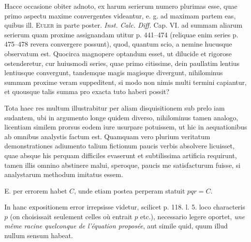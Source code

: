 \expandafter\def\csname HistoricalNoteText3\endcsname{Hacce occasione obiter adnoto, ex harum serierum numero plurimas esse, quae primo aspectu maxime
convergentes videantur, e. g. ad maximam partem eas, quibus ill. \textsc{Euler} in parte poster. \textit{Inst. Calc. Diff.}
Cap. VI. ad summam aliarum serierum quam proxime assignandam utitur p. 441--474 (reliquae enim series
p. 475--478 revera convergere possunt), quod, quantum scio, a nemine hucusque observatum est. Quocirca
magnopere optandum esset, ut dilucide et rigorose ostenderetur, cur huiusmodi series, quae primo citissime,
dein paullatim lentius lentiusque convergunt, tandemque magis magisque divergunt, nihilominus summam
proxime veram suppeditent, si modo non nimis multi termini capiantur, et quousque talis summa pro exacta
tuto haberi possit?}

\expandafter\def\csname HistoricalNoteText4\endcsname{Tota haec res multum illustrabitur per aliam disquisitionem sub prelo iam sudantem, ubi in argumento
longe quidem diverso, nihilominus tamen analogo, licentiam similem prorsus eodem iure usurpare
potuissem, ut hic in aequationibus ab omnibus analystis factum est. Quamquam vero plurium veritatum
demonstrationes adiumento talium fictionum paucis verbis absolvere licuisset, quae absque his perquam difficiles
evaserunt et subtilissima artificia requirunt, tamen illis omnino abstinere malui, speroque, paucis me satisfacturum
fuisse, si analystarum methodum imitatus essem.}

\expandafter\def\csname HistoricalNoteText5\endcsname{E. per errorem habet $C$, unde etiam postea perperam statuit $pqr=C$.}

\expandafter\def\csname HistoricalNoteText6\endcsname{In hanc expositionem error irrepsisse videtur, scilicet p. 118. l. 5. loco characteris $p$ (on choisissait
seulement celles où entrait $p$ etc.), necessario legere oportet, \textit{une même racine quelconque de l'équation
proposée}, aut simile quid, quum illud nullum sensum habeat.}
